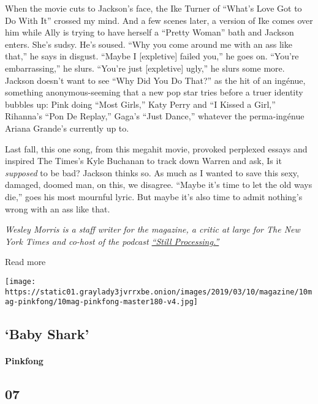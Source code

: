 When the movie cuts to Jackson's face, the Ike Turner of ``What's Love
Got to Do With It'' crossed my mind. And a few scenes later, a version
of Ike comes over him while Ally is trying to have herself a ``Pretty
Woman'' bath and Jackson enters. She's sudsy. He's soused. ``Why you
come around me with an ass like that,'' he says in disgust. ``Maybe I
{[}expletive{]} failed you,'' he goes on. ``You're embarrassing,'' he
slurs. ``You're just {[}expletive{]} ugly,'' he slurs some more. Jackson
doesn't want to see ``Why Did You Do That?'' as the hit of an ingénue,
something anonymous-seeming that a new pop star tries before a truer
identity bubbles up: Pink doing ``Most Girls,'' Katy Perry and ``I
Kissed a Girl,'' Rihanna's ``Pon De Replay,'' Gaga's ``Just Dance,''
whatever the perma-ingénue Ariana Grande's currently up to.

Last fall, this one song, from this megahit movie, provoked perplexed
essays and inspired The Times's Kyle Buchanan to track down Warren and
ask, Is it \emph{supposed} to be bad? Jackson thinks so. As much as I
wanted to save this sexy, damaged, doomed man, on this, we disagree.
``Maybe it's time to let the old ways die,'' goes his most mournful
lyric. But maybe it's also time to admit nothing's wrong with an ass
like that.

\emph{Wesley Morris is a staff writer for the magazine, a critic at
large for The New York Times and co-host of the podcast
\href{https://www.nytimes3xbfgragh.onion/column/still-processing-podcast}{``Still
Processing.''}}

Read more

\texttt{[image: https://static01.graylady3jvrrxbe.onion/images/2019/03/10/magazine/10mag-pinkfong/10mag-pinkfong-master180-v4.jpg]}

\hypertarget{--baby-shark}{%
\subsection{\texorpdfstring{ `Baby
Shark'}{  `Baby Shark'}}\label{--baby-shark}}

\hypertarget{pinkfong}{%
\paragraph{Pinkfong}\label{pinkfong}}

\hypertarget{07}{%
\subsection{07}\label{07}}

